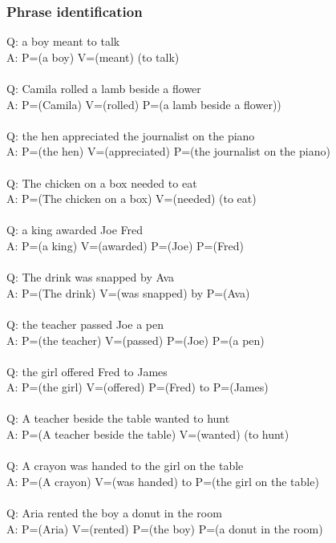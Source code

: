 \documentclass{article} \usepackage{iclr2022_conference,times}
\newcommand{\prompt}[1]{{\footnotesize \textsf{#1}}}
\begin{document}
\subsubsection{Phrase identification}
\prompt{Q: a boy meant to talk \\
A: P=(a boy) V=(meant) (to talk) \\
 \\
Q: Camila rolled a lamb beside a flower \\
A: P=(Camila) V=(rolled) P=(a lamb beside a flower)) \\
 \\
Q: the hen appreciated the journalist on the piano \\
A: P=(the hen) V=(appreciated) P=(the journalist on the piano) \\
 \\
Q: The chicken on a box needed to eat \\
A: P=(The chicken on a box) V=(needed) (to eat) \\
 \\
Q: a king awarded Joe Fred \\
A: P=(a king) V=(awarded) P=(Joe) P=(Fred) \\
 \\
Q: The drink was snapped by Ava \\
A: P=(The drink) V=(was snapped) by P=(Ava) \\
 \\
Q: the teacher passed Joe a pen \\
A: P=(the teacher) V=(passed) P=(Joe) P=(a pen) \\
 \\
Q: the girl offered Fred to James \\
A: P=(the girl) V=(offered) P=(Fred) to P=(James) \\
 \\
Q: A teacher beside the table wanted to hunt \\
A: P=(A teacher beside the table) V=(wanted) (to hunt) \\
 \\
Q: A crayon was handed to the girl on the table \\
A: P=(A crayon) V=(was handed) to P=(the girl on the table) \\
 \\
Q: Aria rented the boy a donut in the room \\
A: P=(Aria) V=(rented) P=(the boy) P=(a donut in the room) \\
 \\
}
\end{document}
